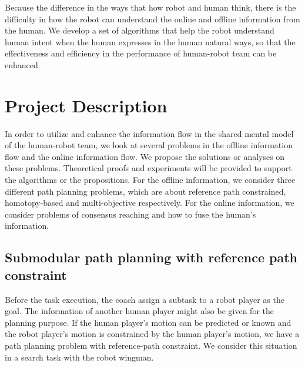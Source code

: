 \documentclass[phd]{byuprop}
\begin{document}

Because the difference in the ways that how robot and human think, there is the difficulty in how the robot can understand the online and offline information from the human.
We develop a set of algorithms that help the robot understand human intent when the human expresses in the human natural ways, so that the effectiveness and efficiency in the performance of human-robot team can be enhanced.

\section{Project Description}

In order to utilize and enhance the information flow in the shared mental model of the human-robot team, we look at several problems in the offline information flow and the online information flow.
We propose the solutions or analyses on these problems.
Theoretical proofs and experiments will be provided to support the algorithms or the propositions.
For the offline information, we consider three different path planning problems, which are about reference path constrained, homotopy-based and multi-objective respectively.
For the online information, we consider problems of consensus reaching and how to fuse the human's information.

\subsection{Submodular path planning with reference path constraint}

Before the task execution, the coach assign a subtask to a robot player as the goal.
The information of another human player might also be given for the planning purpose.
If the human player's motion can be predicted or known and the robot player's motion is constrained by the human player's motion, we have a path planning problem with reference-path constraint.
We consider this situation in a search task with the robot wingman.
\end{document}
